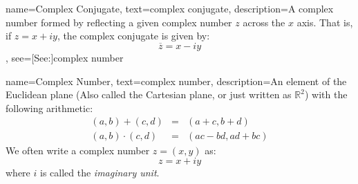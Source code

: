 {
    name={Complex Conjugate},
    text={complex conjugate},
    description={A complex number formed by reflecting a
                 given complex number $z$ across the $x$
                 axis. That is, if $z=x+iy$, the complex
                 conjugate is given by:
                 \begin{equation*}
                     \overline{z}=x-iy
                 \end{equation*}
                },
    see=[See:]{complex number}
}

{
    name={Complex Number},
    text={complex number},
    description={An element of the Euclidean plane (Also called the
                 Cartesian plane, or just written as $\mathbb{R}^{2}$)
                 with the following arithmetic:
                 \begin{eqnarray*}
                     (a,b)+(c,d)
                     \!&\!=\!&\!(a+c,b+d)\\
                     (a,b)\cdot(c,d)
                     \!&\!=\!&\!(ac-bd,ad+bc)
                 \end{eqnarray*}
                 We often write a complex number $z=(x,y)$ as:
                 \begin{equation*}
                     z=x+iy
                 \end{equation*}
                 where $i$ is called the \textit{imaginary unit}.
                }
}

